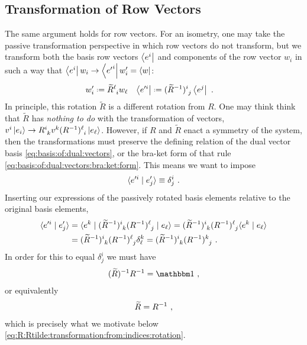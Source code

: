 \documentclass[12pt, oneside]{report}    %
\begin{document}
\subsection{Transformation of Row Vectors}

The same argument holds for row vectors. For an isometry, one may take the passive transformation perspective in which row vectors do not transform, but we transform both the basis row vectors $\left\langle e^i\right|$ and components of the row vector $w_i$ in such a way that $\left\langle e^i\right|w_i \to \left\langle{e'}^i\right|w'_i = \left\langle w\right|$: 
\begin{align}
    w'_i &\defeq \tilde R\aij{\ell}{i} w_\ell
    &
    \bra{e'^i} &\defeq  (\tilde{R}\inv)\aij{i}{j}\bra{e^j} \ .
    \label{eq:passive:transformation:of:row:vector:and:basis}
\end{align}
In principle, this rotation $\tilde R$ is a different rotation from $R$. One may think think that $\tilde R$ has \emph{nothing to do} with the transformation of vectors, $v^i\ket{e_i} \to R\aij{i}{k}v^k(R\inv)\aij{\ell}{i}\ket{e_\ell}$. However, if $R$ and $\tilde R$ enact a symmetry of the system, then the transformations must preserve the defining relation of the dual vector basis \eqref{eq:basis:of:dual:vectors}, or the bra-ket form of that rule \eqref{eq:basis:of:dual:vectors:bra:ket:form}. This means we want to impose
\begin{align}
    \langle e'^i \mid e'_j \rangle \equiv \delta^i_j \ .
    \label{eq:basis:transform:under:rotation}
\end{align}
Inserting our expressions of the passively rotated basis elements relative to the original basis elements,
\begin{align}
    \la e'^i \mid e'_j \ra &= 
    \la e^k \mid (\tilde{R}\inv)\aij{i}{k} (R\inv)\aij{\ell}{j} \mid e_\ell \ra
    =
    (\tilde{R}\inv)\aij{i}{k} (R\inv)\aij{\ell}{j} \la e^k \mid e_\ell \ra
    \\
    &=
    (\tilde{R}\inv)\aij{i}{k} (R\inv)\aij{\ell}{j} \delta^k_\ell
    =
    (\tilde{R}\inv)\aij{i}{k} (R\inv)\aij{k}{j} \ .
\end{align}
In order for this to equal $\delta^i_j$ we must have
\begin{align}
    (\tilde R)\inv R\inv = \one \ ,
\end{align}
or equivalently
\begin{align}
    \widetilde R = R^{-1} \ ,
\end{align}
which is precisely what we motivate below \eqref{eq:R:Rtilde:transformation:from:indices:rotation}. 
\end{document}
